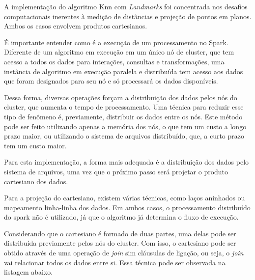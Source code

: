 \documentclass[12pt]{article}
\begin{document}
A implementação do algoritmo Knn com \textit{Landmarks} foi concentrada nos desafios computacionais inerentes à medição de distâncias e projeção de pontos em planos. Ambos os casos envolvem produtos cartesianos.

É importante entender como é a execução de um processamento no Spark. Diferente de um algoritmo em execução em um único nó de cluster, que tem acesso a todos os dados para interações, consultas e transformações, uma instância de algoritmo em execução paralela e distribuída tem acesso aos dados que foram designados para seu nó e só processará os dados disponíveis.

Dessa forma, diversas operações forçam a distribuição dos dados pelos nós do cluster, que aumenta o tempo de processamento. Uma técnica para reduzir esse tipo de fenômeno é, previamente, distribuir os dados entre os nós. Este método pode ser feito utilizando apenas a memória dos nós, o que tem um custo a longo prazo maior, ou utilizando o sistema de arquivos distribuído, que, a curto prazo tem um custo maior.

Para esta implementação, a forma mais adequada é a distribuição dos dados pelo sistema de arquivos, uma vez que o próximo passo será projetar o produto cartesiano dos dados.

Para a projeção do cartesiano, existem várias técnicas, como laços aninhados ou mapeamento linha-linha dos dados. Em ambos casos, o processamento distribuído do spark não é utilizado, já que o algoritmo já determina o fluxo de execução.

Considerando que o cartesiano é formado de duas partes, uma delas pode ser distribuída previamente pelos nós do cluster. Com isso, o cartesiano pode ser obtido através de uma operação de \textit{join} sim cláusulas de ligação, ou seja, o \textit{join} vai relacionar todos os dados entre si. Essa técnica pode ser observada na listagem abaixo.
\end{document}
